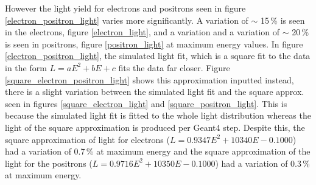 \documentclass[12pt,a4paper]{article}
\begin{document}
However the light yield for electrons and positrons seen in figure \ref{electron_positron_light} varies more significantly. A variation of $\sim$ 15\,\% is seen in the electrons, figure \ref{electron_light}, and a variation and a variation of $\sim$ 20\,\% is seen in positrons, figure \ref{positron_light} at maximum energy values. In figure \ref{electron_positron_light}, the simulated light fit, which is a square fit to the data in the form $L = aE^2 + bE+ c$ fits the data far closer. Figure \ref{square_electron_positron_light} shows this approximation inputted instead, there is a slight variation between the simulated light fit and the square approx. seen in figures \ref{square_electron_light} and \ref{square_positron_light}. This is because the simulated light fit is fitted to the whole light distribution whereas the light of the square approximation is produced per Geant4 step. Despite this, the square approximation of light for electrons ($L = 0.9347E^2 + 10340E - 0.1000$) had a variation of 0.7\,\% at maximum energy and the square approximation of the light for the positrons ($L = 0.9716E^2 + 10350E -0.1000$) had a variation of 0.3\,\% at maximum energy. 
\end{document}
